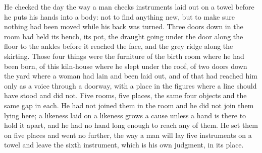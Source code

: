 \scenebreak

He checked the day the way a man checks instruments laid out on a towel before he puts his hands into a body: not to find anything new, but to make sure nothing had been moved while his back was turned. Three doors down in  the room had held its bench, its pot, the draught going under the door along the floor to the ankles before it reached the face, and the grey ridge along the skirting. Those four things were the furniture of the birth room where he had been born, of this kiln-house where he slept under the roof, of  two doors down the yard where a woman had lain and been laid out, and of  that had reached him only as a voice through a doorway, with a place in the figures where a line should have stood and did not. Five rooms, five places, the same four objects and the same gap in each. He had not joined them in the room and he did not join them lying here; a likeness laid on a likeness grows a cause unless a hand is there to hold it apart, and he had no hand long enough to reach any of them. He set them on five places and went no further, the way a man will lay five instruments on a towel and leave the sixth instrument, which is his own judgment, in its place.

